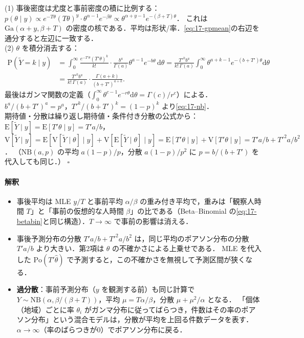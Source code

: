 \documentclass[a4paper,11pt,openany]{ltjsbook}
\newenvironment{proof}[1][証明]{\par\smallskip\noindent{\sffamily\bfseries #1}\quad\ignorespaces}{\nobreak\hfill$\square$\par\medskip}
\newcommand{\E}{\mathrm{E}}
\newcommand{\V}{\mathrm{V}}
\newcommand{\Prob}{\mathrm{P}}
\newcommand{\dd}{\mathrm{d}}
\newcommand{\Po}{\mathrm{Po}}
\newcommand{\Ga}{\mathrm{Ga}}
\newcommand{\NB}{\mathrm{NB}}
\begin{document}
\begin{proof}
(1) 事後密度は尤度と事前密度の積に比例する：
$p(\theta\mid y)\propto e^{-T\theta}(T\theta)^y\cdot\theta^{\alpha-1}e^{-\beta\theta}\propto\theta^{\alpha+y-1}e^{-(\beta+T)\theta}$．
これは $\Ga(\alpha+y,\beta+T)$ の密度の核である．平均は形状/率．\cref{eq:17-gpmean}の右辺を通分すると左辺に一致する．\\
(2) $\theta$ を積分消去する：
\begin{align*}
\Prob(\tilde Y=k\mid y)&=\int_0^\infty\frac{e^{-T'\theta}(T'\theta)^k}{k!}\cdot\frac{b^a}{\Gamma(a)}\theta^{a-1}e^{-b\theta}\,\dd\theta
=\frac{T'^kb^a}{k!\,\Gamma(a)}\int_0^\infty\theta^{a+k-1}e^{-(b+T')\theta}\dd\theta\\
&=\frac{T'^kb^a}{k!\,\Gamma(a)}\cdot\frac{\Gamma(a+k)}{(b+T')^{a+k}} .
\end{align*}
最後はガンマ関数の定義（$\int_0^\infty\theta^{c-1}e^{-r\theta}\dd\theta=\Gamma(c)/r^c$）による．$b^a/(b+T')^a=p^a$，$T'^k/(b+T')^k=(1-p)^k$ より\cref{eq:17-nb}．\\
期待値・分散は繰り返し期待値・条件付き分散の公式から：$\E[\tilde Y\mid y]=\E[T'\theta\mid y]=T'a/b$，
$\V[\tilde Y\mid y]=\E[\V[\tilde Y\mid\theta]\mid y]+\V[\E[\tilde Y\mid\theta]\mid y]=\E[T'\theta\mid y]+\V[T'\theta\mid y]=T'a/b+T'^2a/b^2$．
（$\NB(a,p)$ の平均 $a(1-p)/p$，分散 $a(1-p)/p^2$ に $p=b/(b+T')$ を代入しても同じ．）
\end{proof}
\paragraph{解釈}
\begin{itemize}
\item 事後平均は MLE $y/T$ と事前平均 $\alpha/\beta$ の重み付き平均で，重みは「観察人時間 $T$」と「事前の仮想的な人時間 $\beta$」の比である（Beta--Binomial の\cref{eq:17-betabin}と同じ構造）．$T\to\infty$ で事前の影響は消える．
\item 事後予測分布の分散 $T'a/b+T'^2a/b^2$ は，同じ平均のポアソン分布の分散 $T'a/b$ より大きい．第2項は $\theta$ の不確かさによる上乗せである．
      MLE を代入した $\Po(T'\hat\theta)$ で予測すると，この不確かさを無視して予測区間が狭くなる．
\item \textbf{過分散}：事前予測分布（$y$ を観測する前）も同じ計算で $Y\sim\NB(\alpha,\beta/(\beta+T))$，平均 $\mu=T\alpha/\beta$，分散 $\mu+\mu^2/\alpha$ となる．
      「個体（地域）ごとに率 $\theta_i$ がガンマ分布に従ってばらつき，件数はその率のポアソン分布」という混合モデルは，分散が平均を上回る件数データを表す．
      $\alpha\to\infty$（率のばらつきが0）でポアソン分布に戻る．
\end{itemize}
\end{document}
